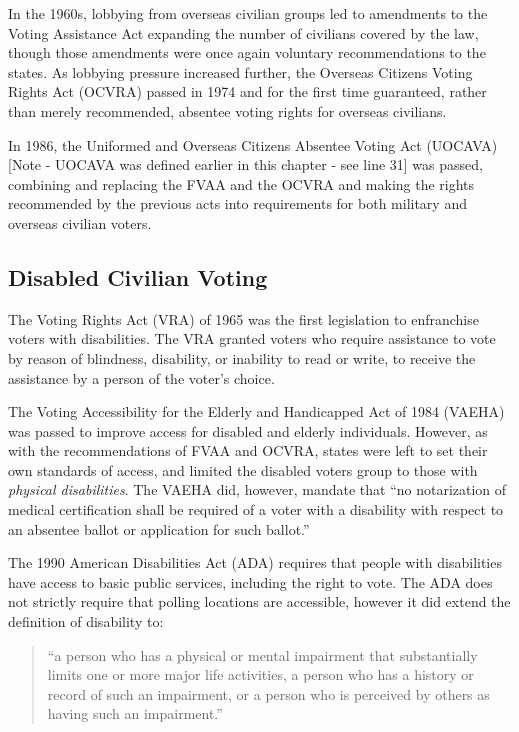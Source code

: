 In the 1960s, lobbying from overseas civilian groups led to amendments
to the Voting Assistance Act expanding the number of civilians covered
by the law, though those amendments were once again voluntary
recommendations to the states. As lobbying pressure increased further,
the Overseas Citizens Voting Rights Act (OCVRA) passed in 1974 and for the first
time guaranteed, rather than merely recommended, absentee voting
rights for overseas civilians.

In 1986, the Uniformed and Overseas Citizens Absentee Voting Act
(UOCAVA) [Note - UOCAVA was defined earlier in this chapter - see line 31] was passed, combining and replacing the FVAA and the OCVRA
and making the rights recommended by the previous acts into
requirements for both military and overseas civilian voters.

\subsection{Disabled Civilian Voting}
The Voting Rights Act (VRA) of 1965 was the first legislation to
enfranchise voters with disabilities. The VRA granted voters who
require assistance to vote by reason of blindness, disability, or
inability to read or write, to receive the assistance by a person of the voter's
choice.

The Voting Accessibility for the Elderly and Handicapped Act of 1984
(VAEHA) was passed to improve access for disabled and elderly
individuals. However, as with the recommendations of FVAA and OCVRA,
states were left to set their own standards of access, and limited the
disabled voters group to those with {\em physical disabilities}. The
VAEHA did, however, mandate that ``no notarization of medical certification
shall be required of a voter with a disability with respect to an
absentee ballot or application for such ballot.''

The 1990 American Disabilities Act (ADA) requires that people with
disabilities have access to basic public services, including the right
to vote. The ADA does not strictly require that polling locations are
accessible, however it did extend the definition of disability to:
\begin{quote}
``a person who has a physical or mental impairment that substantially limits
one or more major life activities, a person who has a history or record of such
an impairment, or a person who is perceived by others as having such an
impairment.''
\end{quote}

